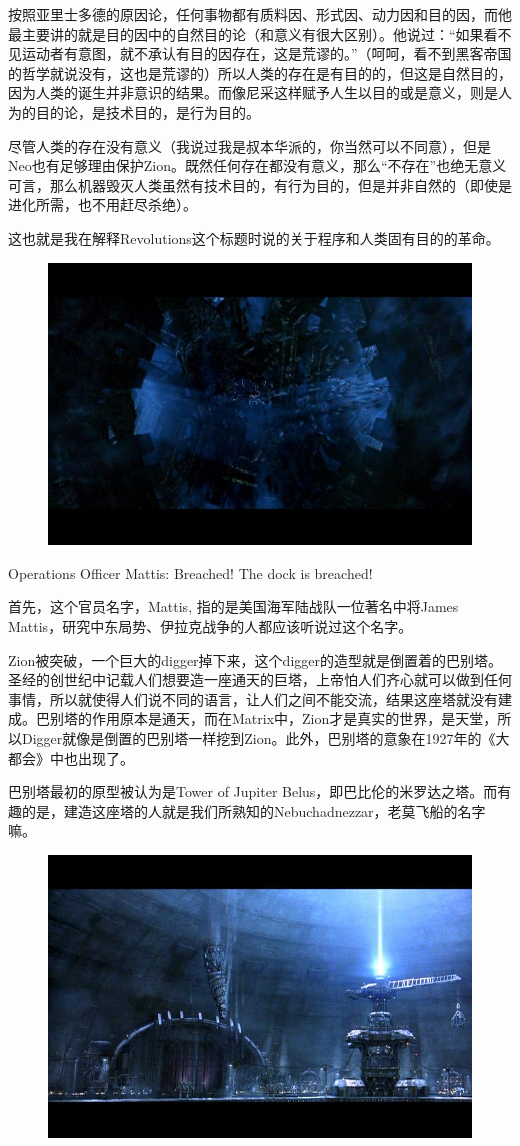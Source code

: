 \documentclass[UTF8]{ctexart}
\newenvironment{myquote}{\color{green} \setlength{\leftskip}{6em} \setlength{\rightskip}{4em} \setlength{\parindent}{-2em}}{\par}
\begin{document}
按照亚里士多德的原因论，任何事物都有质料因、形式因、动力因和目的因，而他最主要讲的就是目的因中的自然目的论（和意义有很大区别）。他说过：“如果看不见运动者有意图，就不承认有目的因存在，这是荒谬的。”（呵呵，看不到黑客帝国的哲学就说没有，这也是荒谬的）所以人类的存在是有目的的，但这是自然目的，因为人类的诞生并非意识的结果。而像尼采这样赋予人生以目的或是意义，则是人为的目的论，是技术目的，是行为目的。

尽管人类的存在没有意义（我说过我是叔本华派的，你当然可以不同意），但是Neo也有足够理由保护Zion。既然任何存在都没有意义，那么“不存在”也绝无意义可言，那么机器毁灭人类虽然有技术目的，有行为目的，但是并非自然的（即使是进化所需，也不用赶尽杀绝）。

这也就是我在解释Revolutions这个标题时说的关于程序和人类固有目的的革命。

\begin{figure}[htb]
\centering
\includegraphics[width=0.5\linewidth]{fig/d272b81259316fcec2fd7854.jpg}
\end{figure}

\begin{myquote}
Operations Officer Mattis: Breached! The dock is breached!
\end{myquote}

首先，这个官员名字，Mattis, 指的是美国海军陆战队一位著名中将James Mattis，研究中东局势、伊拉克战争的人都应该听说过这个名字。

Zion被突破，一个巨大的digger掉下来，这个digger的造型就是倒置着的巴别塔。圣经的创世纪中记载人们想要造一座通天的巨塔，上帝怕人们齐心就可以做到任何事情，所以就使得人们说不同的语言，让人们之间不能交流，结果这座塔就没有建成。巴别塔的作用原本是通天，而在Matrix中，Zion才是真实的世界，是天堂，所以Digger就像是倒置的巴别塔一样挖到Zion。此外，巴别塔的意象在1927年的《大都会》中也出现了。

巴别塔最初的原型被认为是Tower of Jupiter Belus，即巴比伦的米罗达之塔。而有趣的是，建造这座塔的人就是我们所熟知的Nebuchadnezzar，老莫飞船的名字嘛。

\begin{figure}[htb]
\centering
\includegraphics[width=0.5\linewidth]{fig/9f1903089ad2bcd162d986ee.jpg}
\end{figure}
\end{document}
